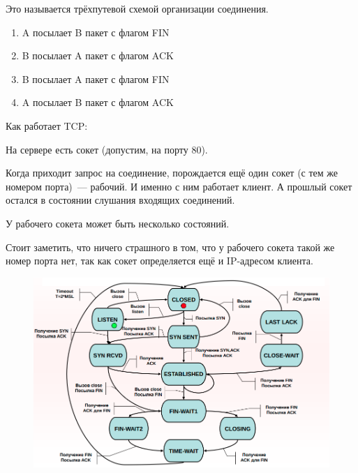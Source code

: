 Это называется трёхпутевой схемой организации соединения.


\begin{enumerate}
    \item A посылает B пакет с флагом FIN
    \item B посылает A пакет с флагом ACK 
    \item B посылает A пакет с флагом FIN
    \item A посылает B пакет с флагом ACK
\end{enumerate}


Как работает TCP:

\begin{MyItemize}
    \item На сервере есть сокет (допустим, на порту 80).
    \item Когда приходит запрос на соединение, порождается ещё один сокет (с тем же номером порта)~--- рабочий. И именно с ним работает клиент. А прошлый сокет остался в состоянии слушания входящих соединений.
    \item У рабочего сокета может быть несколько состояний.
    \item Стоит заметить, что ничего страшного в том, что у рабочего сокета такой же номер порта нет, так как сокет определяется ещё и IP-адресом клиента.
\end{MyItemize}

\begin{figure}[H]
  \centering
  \includegraphics[width=15cm]{images/03/06}
\end{figure}

